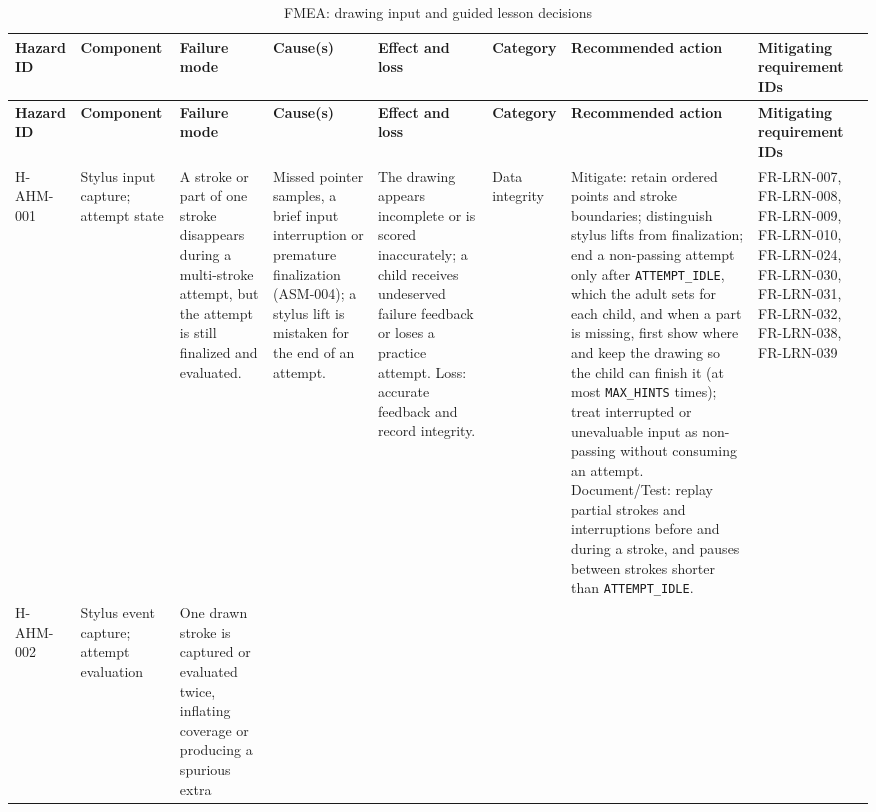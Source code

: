 \documentclass{article}
\newenvironment{fmealandscape}{
    \begin{landscape}
    \pagestyle{empty}
    \AddToShipoutPictureFG{ \AtPageLowerLeft{
        \put(\LenToUnit{\dimexpr\paperwidth-1.5cm\relax},
        \LenToUnit{.5\paperheight}){ \makebox(0,0)[c]{\rotatebox{90}{\thepage}}
        } } } }{
    \end{landscape}
    \ClearShipoutPictureFG }
\begin{document}
\begin{fmealandscape}
{\footnotesize
\setlength{\tabcolsep}{2pt}
\begin{longtable}{@{}
  >{\raggedright\arraybackslash}p{1.85cm} >{\raggedright\arraybackslash}p{1.8cm}
  >{\raggedright\arraybackslash}p{2.4cm} >{\raggedright\arraybackslash}p{2.3cm}
  >{\raggedright\arraybackslash}p{2.6cm} >{\raggedright\arraybackslash}p{1.9cm}
  >{\raggedright\arraybackslash}p{3.4cm}
  >{\raggedright\arraybackslash}p{2.1cm}@{}}
\caption{FMEA: drawing input and guided lesson decisions}
\label{tab:fmea-ahm}\\
\toprule
\textbf{Hazard ID} & \textbf{Component} & \textbf{Failure mode} &
\textbf{Cause(s)} & \textbf{Effect and loss} & \textbf{Category} &
\textbf{Recommended action} & \textbf{Mitigating requirement IDs} \\
\midrule
\endfirsthead
\toprule
\textbf{Hazard ID} & \textbf{Component} & \textbf{Failure mode} &
\textbf{Cause(s)} & \textbf{Effect and loss} & \textbf{Category} &
\textbf{Recommended action} & \textbf{Mitigating requirement IDs} \\
\midrule
\endhead
\bottomrule
\endlastfoot
\mbox{H-AHM-001} & Stylus input capture; attempt state & A stroke or part of one
stroke disappears during a multi-stroke attempt, but the attempt is still
finalized and evaluated. & Missed pointer samples, a brief input interruption or
premature finalization (ASM-004); a stylus lift is mistaken for the end of an
attempt. & The drawing appears incomplete or is scored inaccurately; a child
receives undeserved failure feedback or loses a practice attempt. Loss: accurate
feedback and record integrity. & Data integrity & Mitigate: retain ordered
points and stroke boundaries; distinguish stylus lifts from finalization; end
a non-passing attempt only after \texttt{ATTEMPT\_IDLE}, which the adult sets
for each child, and when a part is missing, first show where and keep the
drawing so the child can finish it (at most \texttt{MAX\_HINTS} times); treat interrupted or unevaluable input as non-passing without
consuming an attempt. Document/Test: replay partial strokes and interruptions
before and during a stroke, and pauses between strokes shorter than
\texttt{ATTEMPT\_IDLE}. & FR-LRN-007, FR-LRN-008, FR-LRN-009, FR-LRN-010,
FR-LRN-024, FR-LRN-030, FR-LRN-031, FR-LRN-032, FR-LRN-038, FR-LRN-039 \\
\addlinespace
\mbox{H-AHM-002} & Stylus event capture; attempt evaluation & One drawn stroke
is captured or evaluated twice, inflating coverage or producing a spurious extra

\end{longtable}}
\end{fmealandscape}
\end{document}

